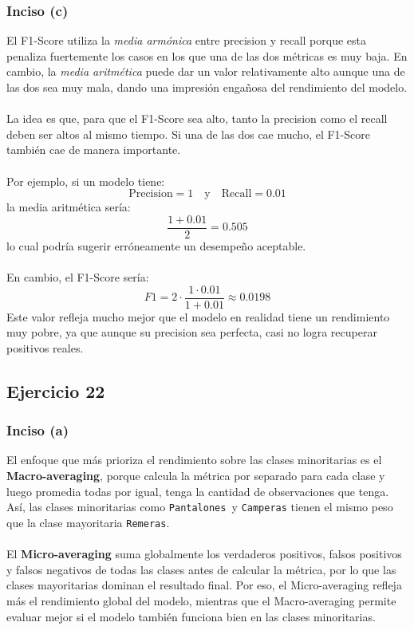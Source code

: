 \documentclass[a4paper,12pt]{article}
\begin{document}
            \subsubsection*{Inciso (c)}
                \noindent El F1-Score utiliza la \emph{media armónica} entre precision y recall porque esta penaliza fuertemente los casos en los que una de las dos métricas es muy baja. En cambio, la \emph{media aritmética} puede dar un valor relativamente alto aunque una de las dos sea muy mala, dando una impresión engañosa del rendimiento del modelo. \\
                \\
                La idea es que, para que el F1-Score sea alto, tanto la precision como el recall deben ser altos al mismo tiempo. Si una de las dos cae mucho, el F1-Score también cae de manera importante. \\
                \\
                Por ejemplo, si un modelo tiene: \[ \text{Precision} = 1 \quad \text{y} \quad \text{Recall} = 0.01 \]
                \noindent la media aritmética sería: \[ \frac{1 + 0.01}{2} = 0.505 \]
                \noindent lo cual podría sugerir erróneamente un desempeño aceptable. \\
                \\
                \noindent En cambio, el F1-Score sería: \[ F1 = 2 \cdot \frac{1 \cdot 0.01}{1 + 0.01} \approx 0.0198 \]
                \noindent Este valor refleja mucho mejor que el modelo en realidad tiene un rendimiento muy pobre, ya que aunque su precision sea perfecta, casi no logra recuperar positivos reales.
            \subsection*{Ejercicio 22}
                \subsubsection*{Inciso (a)}
                    \noindent El enfoque que más prioriza el rendimiento sobre las clases minoritarias es el \textbf{Macro-averaging}, porque calcula la métrica por separado para cada clase y luego promedia todas por igual, tenga la cantidad de observaciones que tenga. Así, las clases minoritarias como \texttt{Pantalones }y \texttt{Camperas} tienen el mismo peso que la clase mayoritaria \texttt{Remeras}. \\
                    \\
                    \noindent El \textbf{Micro-averaging} suma globalmente los verdaderos positivos, falsos positivos y falsos negativos de todas las clases antes de calcular la métrica, por lo que las clases mayoritarias dominan el resultado final. Por eso, el Micro-averaging refleja más el rendimiento global del modelo, mientras que el Macro-averaging permite evaluar mejor si el modelo también funciona bien en las clases minoritarias.
\end{document}

